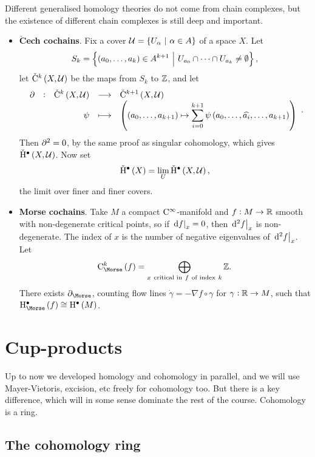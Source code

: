 \begin{remark*}
Different generalised homology theories do not come from chain complexes, but the existence of different chain complexes is still deep and important.
\begin{itemize}
\item \textbf{$\check{\mathbf{C}}$ech cochains}. Fix a cover $ \UUU = \cbr{U_\alpha \st \alpha \in A} $ of a space $ X $. Let
$$ S_k = \cbr{\br{a_0, \dots, a_k} \in A^{k + 1} \st U_{a_0} \cap \dots \cap U_{a_k} \ne \emptyset}, $$
let $ \vC^k\br{X, \UUU} $ be the maps from $ S_k $ to $ \mathbb{Z} $, and let
$$ \function[\da]{\vC^k\br{X, \UUU}}{\vC^{k + 1}\br{X, \UUU}}{\psi}{\br{\br{a_0, \dots, a_{k + 1}} \mapsto \sum_{i = 0}^{k + 1} \psi\br{a_0, \dots, \widehat{a_i}, \dots, a_{k + 1}}}}. $$
Then $ \partial^2 = 0 $, by the same proof as singular cohomology, which gives $ \vH^\bullet\br{X, \UUU} $. Now set
$$ \vH^\bullet\br{X} = \lim_U \vH^\bullet\br{X, \UUU}, $$
the limit over finer and finer covers.
\item \textbf{Morse cochains}. Take $ M $ a compact $ \mathrm{C}^\infty $-manifold and $ f : M \to \mathbb{R} $ smooth with non-degenerate critical points, so if $ \left. \mathrm{d} f \right|_x = 0 $, then $ \left. \mathrm{d}^2f \right|_x $ is non-degenerate. The index of $ x $ is the number of negative eigenvalues of $ \left. \mathrm{d}^2f \right|_x $. Let
$$ \C_{\Morse}^k\br{f} = \bigoplus_{x \ \text{critical in} \ f \ \text{of index} \ k} \ZZ. $$
There exists $ \da_{\Morse} $, counting flow lines $ \dot{\gamma} = -\nabla f \circ \gamma $ for $ \gamma : \mathbb{R} \to M $, such that $ \H_{\Morse}^\bullet\br{f} \cong \H^\bullet\br{M} $.
\end{itemize}
\end{remark*}

\pagebreak

\section{Cup-products}


Up to now we developed homology and cohomology in parallel, and we will use Mayer-Vietoris, excision, etc freely for cohomology too. But there is a key difference, which will in some sense dominate the rest of the course. Cohomology is a ring.

\subsection{The cohomology ring}

